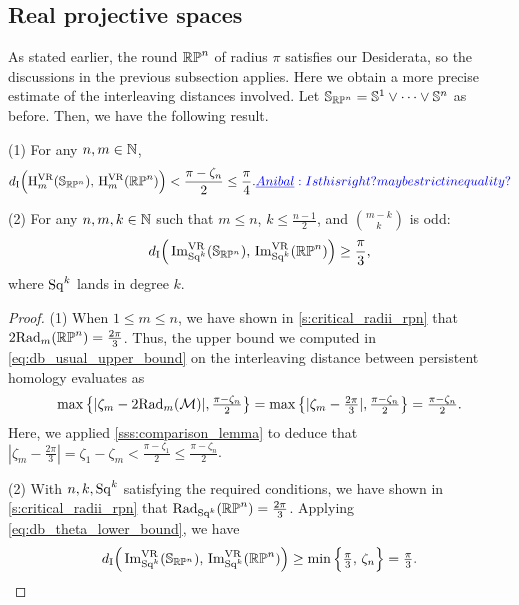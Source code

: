 \subsection{Real projective spaces}\label{ss:distance_estimate_rpn}

As stated earlier, the round \(\mathbb{RP}^n\) of radius \(\pi\) satisfies our Desiderata, so the discussions in the previous subsection applies.
Here we obtain a more precise estimate of the interleaving distances involved.
Let \(\mathbb{S}_{\mathbb{RP}^n} = \mathbb{S}^1 \vee \dots \vee \mathbb{S}^n\) as before.
Then, we have the following result.



\medskip\theorem
(1) For any \(n,m \in \mathbb{N}\),
\[
\di\Big(\rH^\VR_m(\bS_{\rp^n}),\, \rH^\VR_m(\rp^n)\Big) < \frac{\pi - \zeta_n}{2} \leq \frac{\pi}{4}.\anibal{Is this right? maybe strict inequality?}
\]

\noindent (2) For any \(n,m,k \in \mathbb{N}\) such that \(m \leq n\), \(k \leq \tfrac{n-1}{2}\), and \(\binom{m-k}{k}\) is odd:
\[
d_{\mathrm{I}}\Big(\operatorname{Im}_{\mathrm{Sq}^k}^{\mathrm{VR}}(\mathbb{S}_{\mathbb{RP}^n}),\, \operatorname{Im}_{\mathrm{Sq}^k}^{\mathrm{VR}}(\mathbb{RP}^n)\Big) \geq \frac{\pi}{3},
\]
where $\mathrm{Sq}^k$ lands in degree \(k\).

\begin{proof}
    (1) When $1 \leq m \leq n$, we have shown in \cref{s:critical_radii_rpn} that
    $2\mathrm{Rad}_{m}(\mathbb{RP}^n) = \tfrac{2\pi}{3}$.
    Thus, the upper bound we computed in \cref{eq:db_usual_upper_bound} on the interleaving distance between persistent homology evaluates as
    \[\max\big\{|\zeta_m  - 2\mathrm{Rad}_{m}(\mathcal{M}) |, \tfrac{\pi - \zeta_n}{2}\big\} =
    \max \big\{ |\zeta_m  - \tfrac{2\pi}{3} |, \tfrac{\pi - \zeta_n}{2} \big\}
    = \tfrac{\pi - \zeta_n}{2}.
    \]
    Here, we applied \cref{sss:comparison_lemma} to deduce that $|\zeta_m  - \tfrac{2\pi}{3} | = \zeta_1 - \zeta_m < \tfrac{\pi - \zeta_1}{2} \leq \tfrac{\pi - \zeta_n}{2}$.

    (2) With $n,k,\mathrm{Sq}^k$ satisfying the required conditions, we have shown in \cref{s:critical_radii_rpn} that
	$\mathrm{Rad}_{\mathrm{Sq}^k}(\mathbb{RP}^n) = \tfrac{2\pi}{3}$.
    Applying \cref{eq:db_theta_lower_bound}, we have
	\[d_{\mathrm{I}}\Big(\operatorname{Im}_{\mathrm{Sq}^k}^{\mathrm{VR}}(\mathbb{S}_{\mathbb{RP}^n}),\, \operatorname{Im}_{\mathrm{Sq}^k}^{\mathrm{VR}}(\mathbb{RP}^n)\Big)
	\geq \min\Big\{\tfrac{\pi}{3},\, \zeta_n\Big\}
	= \tfrac{\pi}{3}.\qedhere
    \]
\end{proof}